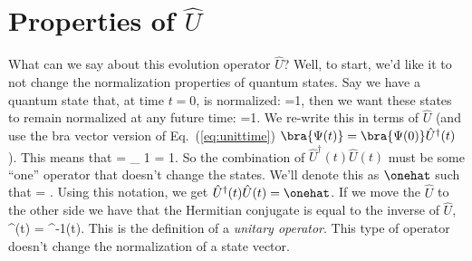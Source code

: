 \section{Properties of $\hat{U}$}

What can we say about this evolution operator $\hat{U}$? Well, to start, we'd like it to not change the normalization properties of quantum states. Say we have a quantum state that, at time $t=0$, is normalized:
\beq
{}=1,
\eeq
then we want these states to remain normalized at any future time:
\beq
{}=1.
\eeq
We re-write this in terms of $\hat{U}$ (and use the bra vector version of Eq.~(\ref{eq:unittime}) $\bra{\Psi(t)} = \bra{\Psi(0)}\hat{U}^\dagger(t)$). This means that
\beq
{}= _{ 1} = 1.
\eeq
So the combination of $\hat{U}^\dagger(t) \hat{U}(t)$ must be some ``one'' operator that doesn't change the states. We'll denote this as $\onehat$ such that
\beq
\onehat \ket{\Psi} = \ket{\Psi}.
\eeq
Using this notation, we get $\hat{U}^\dagger(t) \hat{U}(t) = \onehat$. If we move the $\hat{U}$ to the other side we have that the Hermitian conjugate is equal to the inverse of $\hat{U}$,
\beq
{}^\dagger(t) = ^{-1}(t).
\eeq
This is the definition of a {\em unitary operator}. This type of operator doesn't change the normalization of a state vector. 


